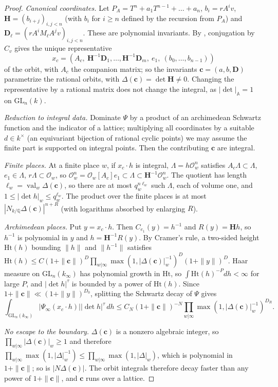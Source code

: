 \documentclass[11pt,oneside,notitlepage]{book}
\numberwithin{equation}{section}
\theoremstyle{plain}
\theoremstyle{definition}
\newcommand{\A}{\mathbb{A}}
\newcommand{\Q}{\mathbb{Q}}
\newcommand{\cO}{\mathcal{O}}
\newcommand{\GL}{\mathrm{GL}}
\newcommand{\val}{\operatorname{val}}
\begin{document}
\begin{proof}
\emph{Canonical coordinates.} Let $P_A=T^n+a_1T^{n-1}+\dots+a_n$, $b_i=rA^iv$, $\mathbf H=(b_{i+j})_{i,j<n}$ (with $b_i$ for $i\ge n$ defined by the recursion from $P_A$) and $\mathbf D_\ell=(rA^iM_\ell A^jv)_{i,j<n}$. These are polynomial invariants. By , conjugation by $C_v$ gives the unique representative
\[x_c=(A_c,\ \mathbf H^{-1}\mathbf D_1,\dots,\mathbf H^{-1}\mathbf D_m,\ e_1,\ (b_0,\dots,b_{n-1}))\]
of the orbit, with $A_c$ the companion matrix; so the invariants $\mathbf c=(a,b,\mathbf D)$ parametrize the rational orbits, with $\Delta(\mathbf c)=\det\mathbf H\ne0$. Changing the representative by a rational matrix does not change the integral, as $|\det|_\A=1$ on $\GL_n(k)$.

\emph{Reduction to integral data.} Dominate $\Psi$ by a product of an archimedean Schwartz function and the indicator of a lattice; multiplying all coordinates by a suitable $d\in k^\times$ (an equivariant bijection of rational cyclic points) we may assume the finite part is supported on integral points. Then the contributing $\mathbf c$ are integral.

\emph{Finite places.} At a finite place $w$, if $x_c\cdot h$ is integral, $\Lambda=h\cO_w^n$ satisfies $A_c\Lambda\subset\Lambda$, $e_1\in\Lambda$, $r\Lambda\subset\cO_w$, so $\cO_w^n=\cO_w[A_c]e_1\subset\Lambda\subset\mathbf H^{-1}\cO_w^n$. The quotient has length $\ell_w=\val_w\Delta(\mathbf c)$, so there are at most $q_w^{n\ell_w}$ such $\Lambda$, each of volume one, and $1\le|\det h|_w\le q_w^{\ell_w}$. The product over the finite places is at most $|N_{k/\Q}\Delta(\mathbf c)|^{n+R}$ (with logarithms absorbed by enlarging $R$).

\emph{Archimedean places.} Put $y=x_c\cdot h$. Then $C_{e_1}(y)=h^{-1}$ and $R(y)=\mathbf Hh$, so $h^{-1}$ is polynomial in $y$ and $h=\mathbf H^{-1}R(y)$. By Cramer's rule, a two-sided height $\mathrm{Ht}(h)$ bounding $\|h\|$ and $\|h^{-1}\|$ satisfies $\mathrm{Ht}(h)\le C(1+\|\mathbf c\|)^D\prod_{w|\infty}\max(1,|\Delta(\mathbf c)|_w^{-1})^D(1+\|y\|)^D$. Haar measure on $\GL_n(k_\infty)$ has polynomial growth in $\mathrm{Ht}$, so $\int\mathrm{Ht}(h)^{-P}dh<\infty$ for large $P$, and $|\det h|^\tau$ is bounded by a power of $\mathrm{Ht}(h)$. Since $1+\|\mathbf c\|\ll(1+\|y\|)^{D_0}$, splitting the Schwartz decay of $\Psi$ gives
\[\int_{\GL_n(k_\infty)}|\Psi_\infty(x_c\cdot h)||\det h|^\tau\,dh\le C_N(1+\|\mathbf c\|)^{-N}\prod_{w|\infty}\max(1,|\Delta(\mathbf c)|_w^{-1})^{D_R}.\]

\emph{No escape to the boundary.} $\Delta(\mathbf c)$ is a nonzero algebraic integer, so $\prod_{w|\infty}|\Delta(\mathbf c)|_w\ge1$ and therefore $\prod_{w|\infty}\max(1,|\Delta|_w^{-1})\le\prod_{w|\infty}\max(1,|\Delta|_w)$, which is polynomial in $1+\|\mathbf c\|$; so is $|N\Delta(\mathbf c)|$. The orbit integrals therefore decay faster than any power of $1+\|\mathbf c\|$, and $\mathbf c$ runs over a lattice.
\end{proof}
\end{document}
